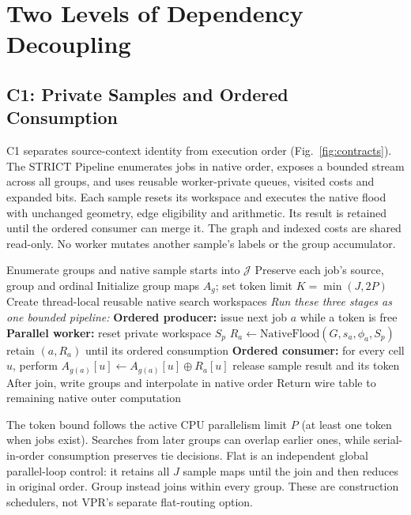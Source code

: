 \section{Two Levels of Dependency Decoupling}

\subsection{C1: Private Samples and Ordered Consumption}
C1 separates source-context identity from execution order (Fig.~\ref{fig:contracts}). The STRICT Pipeline enumerates jobs in native order, exposes a bounded stream across all groups, and uses reusable worker-private queues, visited costs and expanded bits. Each sample resets its workspace and executes the native flood with unchanged geometry, edge eligibility and arithmetic. Its result is retained until the ordered consumer can merge it. The graph and indexed costs are shared read-only. No worker mutates another sample's labels or the group accumulator.

\begin{algorithm}[t]
\caption{C1: bounded STRICT sample execution}\label{alg:c1}
\begin{algorithmic}[1]
\State Enumerate groups and native sample starts into $\mathcal J$
\State Preserve each job's source, group and ordinal
\State Initialize group maps $A_g$; set token limit $K=\min(J,2P)$
\State Create thread-local reusable native search workspaces
\Statex \textit{Run these three stages as one bounded pipeline:}
\State \textbf{Ordered producer:} issue next job $a$ while a token is free
\State \textbf{Parallel worker:} reset private workspace $S_p$
\State \hspace{1em}$R_a\gets\mathrm{NativeFlood}(G,s_a,\phi_a,S_p)$
\State \hspace{1em}retain $(a,R_a)$ until its ordered consumption
\State \textbf{Ordered consumer:} for every cell $u$, perform
\State \hspace{1em}$A_{g(a)}[u]\gets A_{g(a)}[u]\oplus R_a[u]$
\State \hspace{1em}release sample result and its token
\State After join, write groups and interpolate in native order
\State Return wire table to remaining native outer computation
\end{algorithmic}
\end{algorithm}

The token bound follows the active CPU parallelism limit $P$ (at least one token when jobs exist). Searches from later groups can overlap earlier ones, while serial-in-order consumption preserves tie decisions. Flat is an independent global parallel-loop control: it retains all $J$ sample maps until the join and then reduces in original order. Group instead joins within every group. These are construction schedulers, not VPR's separate flat-routing option.

